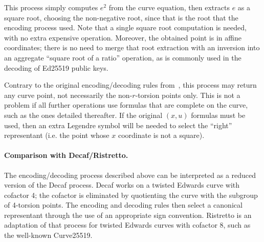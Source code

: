 \documentclass{llncs}
\begin{document}
This process simply computes $e^2$ from the curve equation, then extracts
$e$ as a square root, choosing the non-negative root, since that is the
root that the encoding process used. Note that a single square root
computation is needed, with no extra expensive operation. Moreover, the
obtained point is in affine coordinates; there is no need to merge that
root extraction with an inversion into an aggregate ``square root of a
ratio'' operation, as is commonly used in the decoding of Ed25519 public
keys\cite{EdDSArfc8032}.

Contrary to the original encoding/decoding rules from~\cite{Por2020-5},
this process may return any curve point, not necessarily the
non-$r$-torsion points only. This is not a problem if all further
operations use formulas that are complete on the curve, such as the ones
detailed thereafter. If the original $(x,u)$ formulas must be used, then
an extra Legendre symbol will be needed to select the ``right''
representant (i.e. the point whose $x$ coordinate is not a square).

\paragraph{Comparison with Decaf/Ristretto.}
The encoding/decoding process described above can be interpreted as a
reduced version of the Decaf\cite{Ham2015} process. Decaf works on a
twisted Edwards curve with cofactor 4; the cofactor is eliminated by
quotienting the curve with the subgroup of 4-torsion points. The
encoding and decoding rules then select a canonical representant through
the use of an appropriate sign convention. Ristretto\cite{RistrettoWeb}
is an adaptation of that process for twisted Edwards curves with cofactor
8, such as the well-known Curve25519.
\end{document}
